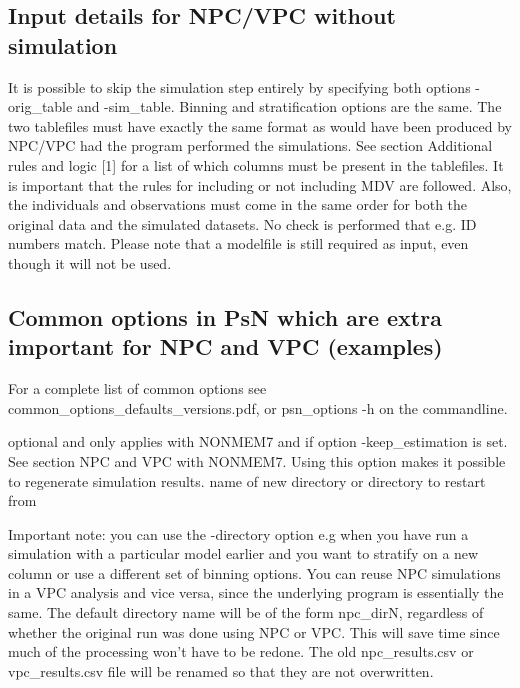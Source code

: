 \subsection{Input details for NPC/VPC without simulation}
It is possible to skip the simulation step entirely by specifying both options -orig\_table and -sim\_table.  Binning and stratification options are the same. The two tablefiles must have exactly the same format as would have been produced by NPC/VPC had the program performed the simulations. See section Additional rules and logic [1] for a list of which columns must be present in the tablefiles. It is important that the rules for including or not including MDV are followed. Also, the individuals and observations must come in the same order for both the original data and the simulated datasets. No check is performed that e.g. ID numbers match. Please note that a modelfile is still required as input, even though it will not be used.

\subsection{Common options in PsN which are extra important for NPC and VPC (examples)}
For a complete list of common options see common\_options\_defaults\_versions.pdf, or psn\_options -h on the commandline.

\begin{optionlist}
\nextopt
{}
optional and only applies with NONMEM7 and if option -keep\_estimation is set. See section NPC and VPC with NONMEM7. 
\nextopt
{}
Using this option makes it possible to regenerate simulation results. 
\nextopt
{}
name of new directory or directory to restart from 
\nextopt
{}

\nextopt
\end{optionlist}

Important note: you can use the -directory option e.g when you have run a simulation with a particular model earlier and you want to stratify on a new column or use a different set of binning options. You can reuse NPC simulations in a VPC analysis and vice versa, since the underlying program is essentially the same. The default directory name will be of the form npc\_dirN, regardless of whether the original run was done using NPC or VPC. This will save time since much of the processing won't have to be redone. The old npc\_results.csv or vpc\_results.csv file will be renamed so that they are not overwritten.

